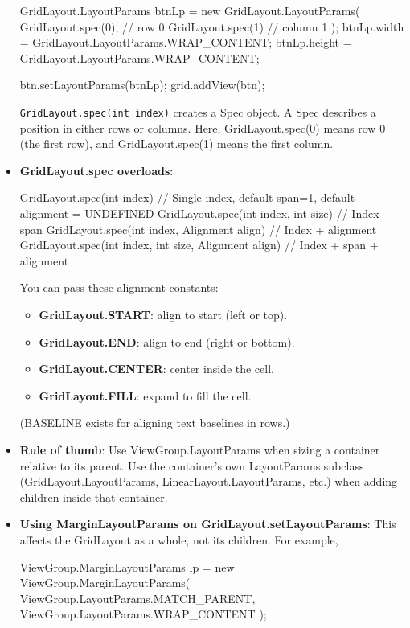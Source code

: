 \documentclass{report}
\begin{document}
\begin{itemize}
\begin{javacode}
                GridLayout.LayoutParams btnLp = new GridLayout.LayoutParams(
                        GridLayout.spec(0),  // row 0
                        GridLayout.spec(1)   // column 1
                );
                btnLp.width = GridLayout.LayoutParams.WRAP_CONTENT;
                btnLp.height = GridLayout.LayoutParams.WRAP_CONTENT;

                btn.setLayoutParams(btnLp);
                grid.addView(btn);
            \end{javacode}
            \bigbreak \noindent 
            \texttt{GridLayout.spec(int index)} creates a Spec object. A Spec describes a position in either rows or columns. Here, GridLayout.spec(0) means row 0 (the first row), and GridLayout.spec(1) means the first column.
        \item \textbf{GridLayout.spec overloads}:
            \bigbreak \noindent 
            \begin{javacode}
                GridLayout.spec(int index) // Single index, default span=1, default alignment = UNDEFINED
                GridLayout.spec(int index, int size) // Index + span
                GridLayout.spec(int index, Alignment align) // Index + alignment
                GridLayout.spec(int index, int size, Alignment align) // Index + span + alignment
            \end{javacode}
            You can pass these alignment constants:
            \begin{itemize}
                \item \textbf{GridLayout.START}: align to start (left or top).
                \item \textbf{GridLayout.END}: align to end (right or bottom).
                \item \textbf{GridLayout.CENTER}: center inside the cell.
                \item \textbf{GridLayout.FILL}: expand to fill the cell.
            \end{itemize}
            (BASELINE exists for aligning text baselines in rows.)

        \item \textbf{Rule of thumb}: 
            Use ViewGroup.LayoutParams when sizing a container relative to its parent.
            \bigbreak \noindent 
            Use the container’s own LayoutParams subclass (GridLayout.LayoutParams, LinearLayout.LayoutParams, etc.) when adding children inside that container.
        \item \textbf{Using MarginLayoutParams on GridLayout.setLayoutParams}: This affects the GridLayout as a whole, not its children.
            \bigbreak \noindent 
            For example, 
            \bigbreak \noindent 
            \begin{javacode}
                ViewGroup.MarginLayoutParams lp =
                new ViewGroup.MarginLayoutParams(
                    ViewGroup.LayoutParams.MATCH_PARENT,
                    ViewGroup.LayoutParams.WRAP_CONTENT
                );


\end{javacode}
\end{itemize}
\end{document}
